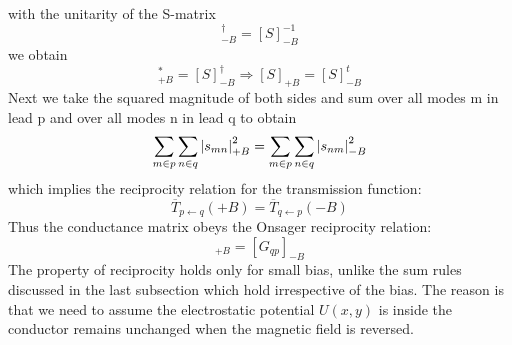 \documentclass[11pt,a4paper]{book}
\theoremstyle{plain}
\theoremstyle{definition}
\theoremstyle{remark}
\begin{document}
with the unitarity of the S-matrix
\begin{equation}
    [S]^\dagger_{-B} = [S]^{-1}_{-B}
\end{equation}
we obtain
\begin{equation}
    [S]^*_{+B} = [S]^\dagger_{-B} \Rightarrow [S]_{+B} = [S]^t_{-B}
\end{equation}
Next we take the squared magnitude of both sides and sum over all modes m in lead p and over all modes n in lead q to obtain
\begin{equation}
    \sum_{m \in p} \sum_{n \in q} \abs{s_{mn}}_{+B}^2 = \sum_{m \in p} \sum_{n \in q} \abs{s_{nm}}_{-B}^2
\end{equation}
which implies the reciprocity relation for the transmission function:
\begin{equation}
\overline{T}_{p \leftarrow q}(+B) = \overline{T}_{q \leftarrow p}(-B)
\end{equation}
Thus the conductance matrix obeys the Onsager reciprocity relation:
\begin{equation}
    [G_{pq}]_{+B} = [G_{qp}]_{-B}
\end{equation}
The property of reciprocity holds only for small bias, unlike the sum rules discussed in the last subsection which hold irrespective of the bias. The reason is that we need to assume the electrostatic potential $U(x,y)$ is inside the conductor remains unchanged when the magnetic field is reversed.
\end{document}
